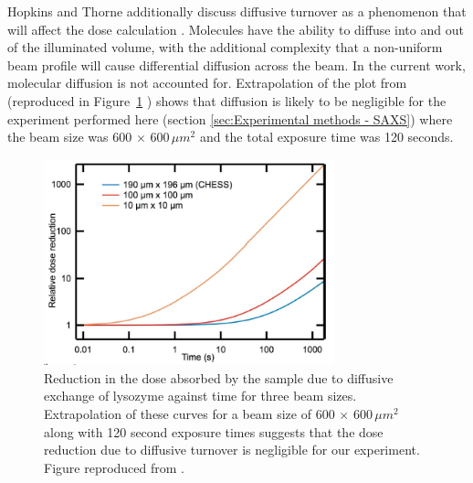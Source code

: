 Hopkins and Thorne additionally discuss diffusive turnover as a phenomenon that will affect the dose calculation \cite{hopkins2016quantifying}.
Molecules have the ability to diffuse into and out of the illuminated volume, with the additional complexity that a non-uniform beam profile will cause differential diffusion across the beam.
In the current work, molecular diffusion is not accounted for.
Extrapolation of the plot from \cite{hopkins2016quantifying} (reproduced in Figure~\ref{fig:Diffusive turnover effect} ) shows that diffusion is likely to be negligible for the experiment performed here (section \ref{sec:Experimental methods - SAXS}) where the beam size was 600 $\times$ 600$\,\mu m^{\text{2}}$ and the total exposure time was 120 seconds.
\begin{figure}
    \centering
    \includegraphics[width=0.75\textwidth]{figures/saxs/diffusive_turnover_effect.png}
    \caption{Reduction in the dose absorbed by the sample due to diffusive exchange of lysozyme against time for three beam sizes.
    Extrapolation of these curves for a beam size of 600 $\times$ 600$\,\mu m^{\text{2}}$ along with 120 second exposure times suggests that the dose reduction due to diffusive turnover is negligible for our experiment.
    Figure reproduced from \cite{hopkins2016quantifying}.}
    \label{fig:Diffusive turnover effect}
\end{figure}

